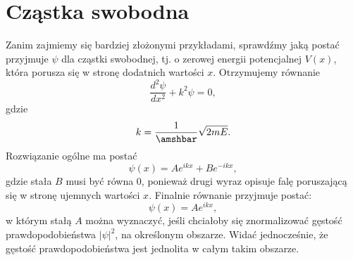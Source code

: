 \documentclass{SGGW-thesis}
\begin{document}
	\section{Cząstka swobodna}
	Zanim zajmiemy się bardziej złożonymi przykładami, sprawdźmy jaką postać przyjmuje $\psi$ dla cząstki swobodnej, tj. o zerowej energii potencjalnej $V(x)$, która porusza się w stronę dodatnich wartości $x$. Otrzymujemy równanie 
	\begin{equation}\label{eqn:free-particle-schrodigner}
	\frac{d^2\psi}{dx^2}+k^2\psi=0,
	\end{equation}
gdzie
	\begin{equation}
	k=\frac{1}{\amshbar}\sqrt{2mE}.
	\end{equation}
Rozwiązanie ogólne ma postać
	\begin{equation}\label{eqn:free-particle-gen-solution}
	\psi(x)=Ae^{ikx} + Be^{-ikx},
	\end{equation}
gdzie stała $B$ musi być równa 0, ponieważ drugi wyraz opisuje falę poruszającą się w stronę ujemnych wartości $x$. Finalnie równanie przyjmuje postać:
	\begin{equation}\label{eqn:free-particle-solution}
	\psi(x) = Ae^{ikx},
	\end{equation}
w którym stałą $A$ można wyznaczyć, jeśli chciałoby się znormalizować gęstość prawdopodobieństwa $|\psi|^2$, na określonym obszarze. Widać jednocześnie, że gęstość prawdopodobieństwa jest jednolita w całym takim obszarze.
	
\end{document}
